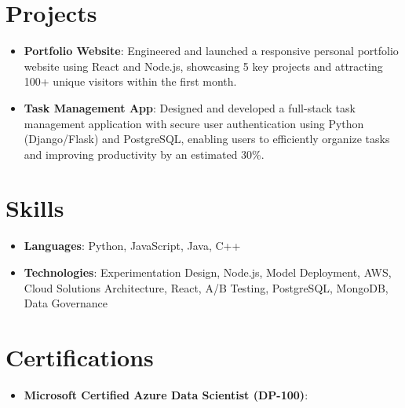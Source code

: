 \documentclass[letterpaper,11pt]{article}
\newcommand{\resumeItem}[2]{
  \item\small{
    \textbf{#1}{: #2 \vspace{-2pt}}
  }
}
\newcommand{\resumeSubItem}[2]{\resumeItem{#1}{#2}\vspace{-4pt}}
\newcommand{\resumeSubHeadingListStart}{\begin{itemize}[leftmargin=*]}
\newcommand{\resumeSubHeadingListEnd}{\end{itemize}}
\newcommand{\resumeItemListStart}{\begin{itemize}}
\newcommand{\resumeItemListEnd}{\end{itemize}\vspace{-5pt}}
\begin{document}
\section{Projects}
  \resumeSubHeadingListStart
    \resumeSubItem{Portfolio Website}
      {Engineered and launched a responsive personal portfolio website using React and Node.js, showcasing 5 key projects and attracting 100+ unique visitors within the first month.}
    \resumeSubItem{Task Management App}
      {Designed and developed a full-stack task management application with secure user authentication using Python (Django/Flask) and PostgreSQL, enabling users to efficiently organize tasks and improving productivity by an estimated 30\%.}
  \resumeSubHeadingListEnd

\section{Skills}
  \resumeItemListStart
    \resumeItem{Languages}{Python, JavaScript, Java, C++}
    \resumeItem{Technologies}{Experimentation Design, Node.js, Model Deployment, AWS, Cloud Solutions Architecture, React, A/B Testing, PostgreSQL, MongoDB, Data Governance}
  \resumeItemListEnd

\section{Certifications}
  \resumeItemListStart
    \resumeItem{Microsoft Certified Azure Data Scientist (DP-100)}{}
  \resumeItemListEnd
\end{document}
